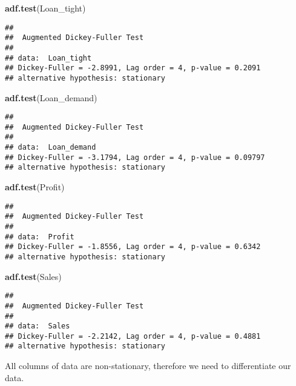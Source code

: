 \documentclass[
]{article}
\newenvironment{Shaded}{\begin{snugshade}}{\end{snugshade}}
\newcommand{\FunctionTok}[1]{\textcolor[rgb]{0.13,0.29,0.53}{\textbf{#1}}}
\newcommand{\NormalTok}[1]{#1}
\begin{document}
\begin{Shaded}
\begin{Highlighting}[]
\FunctionTok{adf.test}\NormalTok{(Loan\_tight)}
\end{Highlighting}
\end{Shaded}

\begin{verbatim}
## 
##  Augmented Dickey-Fuller Test
## 
## data:  Loan_tight
## Dickey-Fuller = -2.8991, Lag order = 4, p-value = 0.2091
## alternative hypothesis: stationary
\end{verbatim}

\begin{Shaded}
\begin{Highlighting}[]
\FunctionTok{adf.test}\NormalTok{(Loan\_demand)}
\end{Highlighting}
\end{Shaded}

\begin{verbatim}
## 
##  Augmented Dickey-Fuller Test
## 
## data:  Loan_demand
## Dickey-Fuller = -3.1794, Lag order = 4, p-value = 0.09797
## alternative hypothesis: stationary
\end{verbatim}

\begin{Shaded}
\begin{Highlighting}[]
\FunctionTok{adf.test}\NormalTok{(Profit)}
\end{Highlighting}
\end{Shaded}

\begin{verbatim}
## 
##  Augmented Dickey-Fuller Test
## 
## data:  Profit
## Dickey-Fuller = -1.8556, Lag order = 4, p-value = 0.6342
## alternative hypothesis: stationary
\end{verbatim}

\begin{Shaded}
\begin{Highlighting}[]
\FunctionTok{adf.test}\NormalTok{(Sales)}
\end{Highlighting}
\end{Shaded}

\begin{verbatim}
## 
##  Augmented Dickey-Fuller Test
## 
## data:  Sales
## Dickey-Fuller = -2.2142, Lag order = 4, p-value = 0.4881
## alternative hypothesis: stationary
\end{verbatim}

All columns of data are non-stationary, therefore we need to
differentiate our data.
\end{document}
